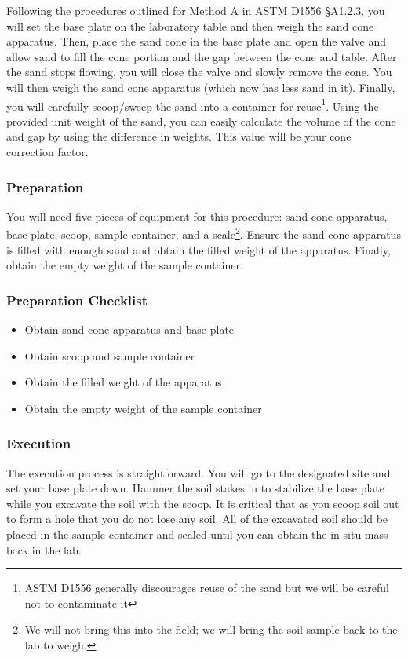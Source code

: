 \documentclass[12pt]{article}
\begin{document}
Following the procedures outlined for Method A in ASTM D1556 \S A1.2.3, you will set the base plate on the laboratory table and then weigh the sand cone apparatus. Then, place the sand cone in the base plate and open the valve and allow sand to fill the cone portion and the gap between the cone and table. After the sand stops flowing, you will close the valve and slowly remove the cone. You will then weigh the sand cone apparatus (which now has less sand in it). Finally, you will carefully scoop/sweep the sand into a container for reuse\footnote{ASTM D1556 generally discourages reuse of the sand but we will be careful not to contaminate it}. Using the provided unit weight of the sand, you can easily calculate the volume of the cone and gap by using the difference in weights. This value will be your cone correction factor.

\subsubsection{Preparation}
You will need five pieces of equipment for this procedure: sand cone apparatus, base plate, scoop, sample container, and a scale\footnote{We will not bring this into the field; we will bring the soil sample back to the lab to weigh.}. Ensure the sand cone apparatus is filled with enough sand and obtain the filled weight of the apparatus. Finally, obtain the empty weight of the sample container.

\subsubsection*{Preparation Checklist}
\begin{itemize}
    \item Obtain sand cone apparatus and base plate
    \item Obtain scoop and sample container
    \item Obtain the filled weight of the apparatus
    \item Obtain the empty weight of the sample container
\end{itemize}

\subsubsection{Execution}
The execution process is straightforward. You will go to the designated site and set your base plate down. Hammer the soil stakes in to stabilize the base plate while you excavate the soil with the scoop. It is critical that as you scoop soil out to form a hole that you do not lose any soil. All of the excavated soil should be placed in the sample container and sealed until you can obtain the in-situ mass back in the lab.
\end{document}
